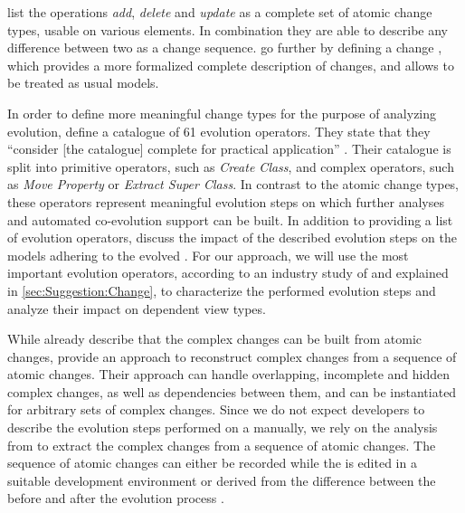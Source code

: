 \textcite{khelladi_detecting_2015} list the operations \emph{add}, \emph{delete} and \emph{update} as a complete set of atomic change types, usable on various \metamodel elements.
In combination they are able to describe any difference between two \metamodels as a change sequence.
\textcite{burger_change_2010} go further by defining a change \metamodel, which provides a more formalized complete description of \metamodel changes, and allows \metamodels to be treated as usual models.

In order to define more meaningful change types for the purpose of analyzing \metamodel evolution, \textcite{herrmannsdoerfer_extensive_2011} define a catalogue of 61 \metamodel evolution operators.
They state that they ``consider [the catalogue] complete for practical application'' \autocite{herrmannsdoerfer_extensive_2011}.
Their catalogue is split into primitive operators, such as \emph{Create Class}, and complex operators, such as \emph{Move Property} or \emph{Extract Super Class}.
In contrast to the atomic change types, these operators represent meaningful evolution steps on which further analyses and automated co-evolution support can be built.
In addition to providing a list of \metamodel evolution operators, \textcite{herrmannsdoerfer_extensive_2011} discuss the impact of the described evolution steps on the models adhering to the evolved \metamodels.
For our approach, we will use the most important evolution operators, according to an industry study of \textcite{khelladi_detecting_2015} and explained in \cref{sec:Suggestion:Change}, to characterize the performed evolution steps and analyze their impact on dependent view types.

While \textcite{herrmannsdoerfer_extensive_2011} already describe that the complex changes can be built from atomic changes, \cite{khelladi_change_2018} provide an approach to reconstruct complex changes from a sequence of atomic changes.
Their approach can handle overlapping, incomplete and hidden complex changes, as well as dependencies between them, and can be instantiated for arbitrary sets of complex changes.
Since we do not expect developers to describe the evolution steps performed on a \metamodel manually, we rely on the analysis from \cite{khelladi_change_2018} to extract the complex changes from a sequence of atomic changes.
The sequence of atomic changes can either be recorded while the \metamodel is edited in a suitable development environment or derived from the difference between the \metamodel before and after the evolution process \autocite{wittler_derivation_2021}.
